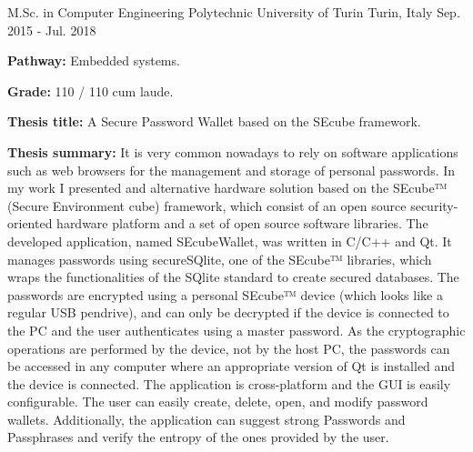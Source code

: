 

\begin{cventries}

  \cventry
    {M.Sc. in Computer Engineering}
    {Polytechnic University of Turin}
    {Turin, Italy}
    {Sep. 2015 - Jul. 2018}
    {
      \begin{cvitems}
        \item {\textbf{Pathway:} Embedded systems.}
        \item {\textbf{Grade:} 110 / 110 cum laude.}
        \item {\textbf{Thesis title:}  A Secure Password Wallet based on the
        SEcube framework.}
        \item {\textbf{Thesis summary:} It is very common nowadays to rely on software
        applications such as web browsers for the management and storage of personal
        passwords.
        In my work I presented and alternative hardware solution based on the SEcube™
        (Secure Environment cube) framework, which consist of an open source
        security-oriented hardware platform and a set of open source software libraries.
        The developed application, named SEcubeWallet,
        was written in C/C++ and Qt. It manages passwords using secureSQlite,
        one of the SEcube™ libraries, which wraps the functionalities of the SQlite
        standard to create secured databases. The passwords are encrypted using a
        personal SEcube™ device (which looks like a regular USB pendrive),
        and can only be decrypted if the device is connected to the PC and the
        user authenticates using a master password.
        As the cryptographic operations are performed by the device, not by the host PC, the
        passwords can be accessed in any computer where an appropriate
        version of Qt is installed and the device is connected.
        The application is cross-platform and the GUI is easily configurable.
        The user can easily create, delete, open,
        and modify password wallets. Additionally, the application can suggest strong Passwords and
        Passphrases and verify the entropy of the ones provided by the user.
        }
      \end{cvitems}
    }


\end{cventries}

